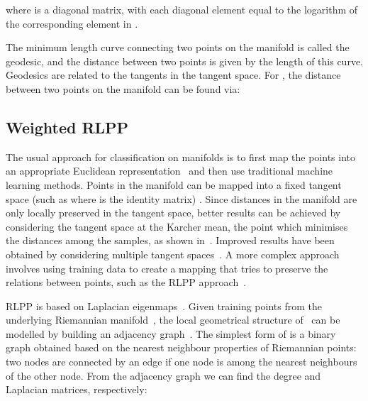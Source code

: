 \documentclass[10pt,twocolumn,letterpaper]{article}
\newcommand{\eqsize}{\footnotesize}
\begin{document}
\normalsize

\noindent
where {\small } is a diagonal matrix,
with each diagonal element equal to the logarithm of the corresponding element in {\small }.

The minimum length curve connecting two points on the manifold is called the geodesic,
and the distance between two points is given by the length of this curve.
Geodesics are related to the tangents in the tangent space.
For {\eqsize }, the distance between two points on the manifold can be found via:

\noindent
\eqsize

\normalsize



\subsection{Weighted RLPP}
\label{sec:wrlpp}





The usual approach for classification on manifolds
is to first map the points into an appropriate Euclidean representation~\cite{TuzelEtAl2008}
and then use traditional machine learning methods.
Points in the manifold can be mapped into a fixed tangent space (such as  where  is the identity matrix) \cite{GuoEtAl2010}.
Since distances in the manifold are only locally preserved in the tangent space,
better results can be achieved by considering the tangent space at the Karcher mean,
the point which minimises the distances among the samples, as shown in~\cite{TuzelEtAl2008}.
Improved results have been obtained by considering multiple tangent spaces~\cite{Lui2010,SaninEtAl2012}.
A more complex approach involves using training data to create a mapping that tries to preserve
the relations between points, such as the RLPP approach~\cite{HarandiEtAl2012}.



RLPP is based on Laplacian eigenmaps~\cite{BelkinAndNiyogi2003}.
Given {\eqsize } training points
\mbox{\eqsize }
from the underlying Riemannian manifold~{\eqsize },
the local geometrical structure of~{\eqsize } can be modelled by building an adjacency graph~{\eqsize }.
The simplest form of {\eqsize } is a binary graph obtained based on the nearest neighbour properties of Riemannian points:
two nodes are connected by an edge if one node is among the  nearest neighbours of the other node.
From the adjacency graph {\eqsize } we can find the degree and Laplacian matrices, respectively:
\end{document}
